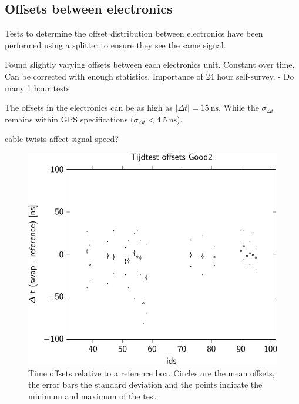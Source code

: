 \subsection{Offsets between \hisparc electronics}
\label{sub:gps_offsets}

Tests to determine the offset distribution between \hisparc electronics
have been performed using a \gps splitter to ensure they see the same
\gps signal.

Found slightly varying offsets between each \hisparc electronics unit.
Constant over time. Can be corrected with enough statistics.
Importance of 24 hour self-survey. - Do many 1 hour tests


The offsets in the \hisparc electronics can be as high as $|\Delta t| =
\SI{15}{\nano\second}$. While the $\sigma_{\Delta t}$ remains within GPS
specifications ($\sigma_{\Delta t} < \SI{4.5}{\nano\second}$).


\gps cable twists affect signal speed?

\begin{figure}
    \centering
    \includegraphics{plots/calibration/hisparc_offsets}
    \caption{Time offsets relative to a reference box. Circles are the
             mean offsets, the error bars the standard deviation and the
             points indicate the minimum and maximum of the test.}
    \label{fig:hisparc_offsets}
\end{figure}



